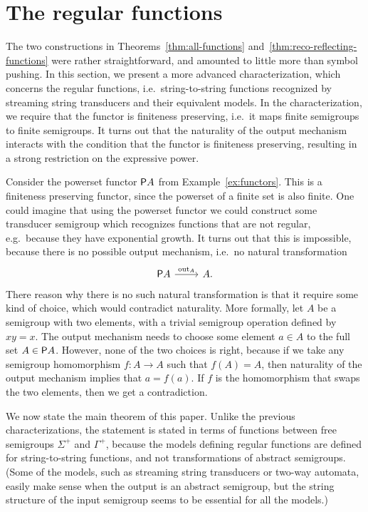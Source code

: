 

\section{The regular functions}
\label{sec:reg-char}
The two constructions in Theorems~\ref{thm:all-functions} and~\ref{thm:reco-reflecting-functions} were rather straightforward, and amounted to little more than symbol pushing. In this section, we present a more advanced  characterization, which concerns  the regular functions, i.e.~string-to-string functions recognized by streaming string transducers and their equivalent models. In the characterization, we require that the functor is finiteness preserving, i.e.~it maps finite semigroups to finite semigroups. It turns out that the naturality of the output mechanism interacts with the condition that 
the functor is finiteness preserving, resulting in a strong restriction on the expressive power.

\begin{myexample}
    Consider the powerset functor $\mathsf P A$ from Example~\ref{ex:functors}. This is a finiteness preserving functor, since the powerset of a finite set is also finite. One could imagine that using the powerset functor we could construct some transducer semigroup which recognizes functions that are not regular, e.g.~because they have exponential growth. It turns out that this is impossible, because there is no possible output mechanism, i.e.~no natural transformation 
    \[
    \begin{tikzcd}
    \powerset A 
    \ar[r,"\outfun_A"]
    &
    A.
    \end{tikzcd}
    \]
    There reason why there is no such natural transformation is that it require some kind of choice, which would contradict naturality. More formally, let $A$ be a semigroup with two elements, with a trivial semigroup operation defined by $xy=x$. The output mechanism needs to choose some element $a \in A$ to the full set $A \in \mathsf P A$. However, none of the two choices is right, because if we take any semigroup homomorphism $f : A \to A$ such that $f(A)=A$, then  naturality of the output mechanism implies that $a=f(a)$. If $f$ is the homomorphism that swaps the two elements, then we get a contradiction.
\end{myexample}


We now state the main theorem of this paper. Unlike the previous characterizations, the statement is stated in terms of functions between free semigroups $\Sigma^+$ and $\Gamma^+$, because the models defining regular functions are defined for string-to-string functions, and not transformations of abstract semigroups. (Some of the models, such as streaming string transducers or two-way automata, easily make sense when the output is an abstract semigroup, but the string structure of the input semigroup seems to be essential for all the models.) 

